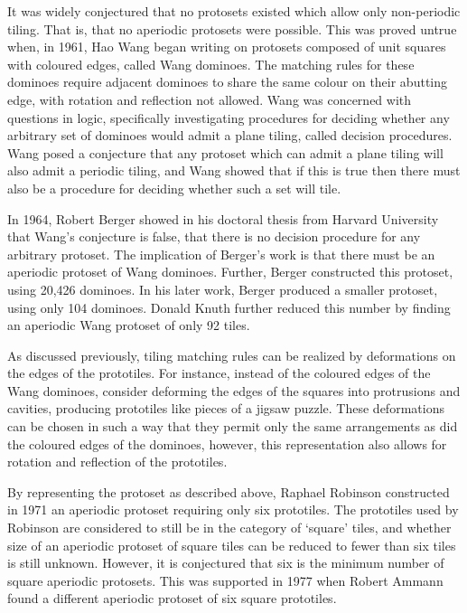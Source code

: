 \documentclass[]{article}
\begin{document}
It was widely conjectured that no protosets existed which allow only non-periodic tiling. That is, that no aperiodic protosets were possible. This was proved untrue when, in 1961, Hao Wang began writing on protosets composed of unit squares with coloured edges, called Wang dominoes. The matching rules for these dominoes require adjacent dominoes to share the same colour on their abutting edge, with rotation and reflection not allowed. Wang was concerned with questions in logic, specifically investigating procedures for deciding whether any arbitrary set of dominoes would admit a plane tiling, called decision procedures. Wang posed a conjecture that any protoset which can admit a plane tiling will also admit a periodic tiling, and Wang showed that if this is true then there must also be a procedure for deciding whether such a set will tile. 

In 1964, Robert Berger showed in his doctoral thesis from Harvard University that Wang's conjecture is false, that there is no decision procedure for any arbitrary protoset. The implication of Berger's work is that there must be an aperiodic protoset of Wang dominoes. Further, Berger constructed this protoset, using 20,426 dominoes. In his later work, Berger produced a smaller protoset, using only 104 dominoes. Donald Knuth further reduced this number by finding an aperiodic Wang protoset of only 92 tiles.

As discussed previously, tiling matching rules can be realized by deformations on the edges of the prototiles. For instance, instead of the coloured edges of the Wang dominoes, consider deforming the edges of the squares into protrusions and cavities, producing prototiles like pieces of a jigsaw puzzle. These deformations can be chosen in such a way that they permit only the same arrangements as did the coloured edges of the dominoes, however, this representation also allows for rotation and reflection of the prototiles. 

By representing the protoset as described above, Raphael Robinson constructed in 1971 an aperiodic protoset requiring only six prototiles. The prototiles used by Robinson are considered to still be in the category of `square' tiles, and whether size of an aperiodic protoset of square tiles can be reduced to fewer than six tiles is still unknown. However, it is conjectured that six is the minimum number of square aperiodic protosets. This was supported in 1977 when Robert Ammann found a different aperiodic protoset of six square prototiles.
\end{document}
